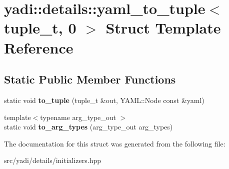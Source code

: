 \hypertarget{structyadi_1_1details_1_1yaml__to__tuple_3_01tuple__t_00_010_01_4}{}\section{yadi\+:\+:details\+:\+:yaml\+\_\+to\+\_\+tuple$<$ tuple\+\_\+t, 0 $>$ Struct Template Reference}
\label{structyadi_1_1details_1_1yaml__to__tuple_3_01tuple__t_00_010_01_4}
\subsection*{Static Public Member Functions}
\begin{DoxyCompactItemize}
\item 
\mbox{\label{structyadi_1_1details_1_1yaml__to__tuple_3_01tuple__t_00_010_01_4_a5d8bce7dc03e42221c09af80cdef2ef5}} 
static void {\bfseries to\+\_\+tuple} (tuple\+\_\+t \&out, Y\+A\+M\+L\+::\+Node const \&yaml)
\item 
\mbox{\label{structyadi_1_1details_1_1yaml__to__tuple_3_01tuple__t_00_010_01_4_a891c11157210a181cf92882730a9940e}} 
{\footnotesize template$<$typename arg\+\_\+type\+\_\+out $>$ }\\static void {\bfseries to\+\_\+arg\+\_\+types} (arg\+\_\+type\+\_\+out arg\+\_\+types)
\end{DoxyCompactItemize}


The documentation for this struct was generated from the following file\+:\begin{DoxyCompactItemize}
\item 
src/yadi/details/initializers.\+hpp\end{DoxyCompactItemize}
